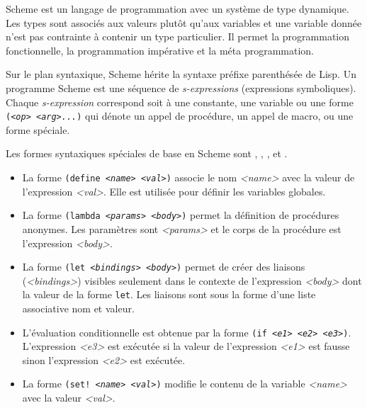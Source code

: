 Scheme est un langage de programmation avec un
système de type dynamique.  Les types sont associés aux valeurs plutôt qu'aux
variables et une variable donnée n'est pas contrainte à contenir un type
particulier.  Il permet la programmation fonctionnelle, la programmation
impérative et la méta programmation.

Sur le plan syntaxique, Scheme hérite la
syntaxe préfixe parenthésée de Lisp.  Un programme Scheme est une séquence de
\textit{s-expressions} (expressions symboliques).  Chaque \textit{s-expression} correspond soit à une
constante, une variable ou une forme \texttt{(\textit{<op>} \textit{<arg>...})}
qui dénote un appel de procédure, un appel de macro, ou une forme spéciale.

Les formes syntaxiques spéciales de base en Scheme sont , ,
,  et .
\begin{itemize}
  \item La forme \texttt{(define \textit{<name>} \textit{<val>})} associe le
    nom \textit{<name>} avec la valeur de l'expression \textit{<val>}. Elle est
    utilisée pour définir les variables globales.

  \item La forme \texttt{(lambda \textit{<params>} \textit{<body>})} permet la définition de
    procédures anonymes. Les paramètres sont \textit{<params>} et le corps
    de la procédure est l'expression \textit{<body>}.

  \item La forme \texttt{(let \textit{<bindings>} \textit{<body>})} permet de
    créer des liaisons (\textit{<bindings>}) visibles seulement dans le
    contexte de l'expression \textit{<body>} dont la valeur de la forme
    \texttt{let}. Les liaisons sont sous la forme d'une liste associative
    nom et valeur.

  \item L'évaluation conditionnelle est obtenue par la forme \texttt{(if
    \textit{<e1>} \textit{<e2>} \textit{<e3>})}.  L'expression \textit{<e3>}
    est exécutée si la valeur de l'expression \textit{<e1>} est fausse sinon
    l'expression \textit{<e2>} est exécutée.

  \item La forme \texttt{(set! \textit{<name>} \textit{<val>})} modifie le contenu de la variable
    \textit{<name>} avec la valeur \textit{<val>}.
\end{itemize}

